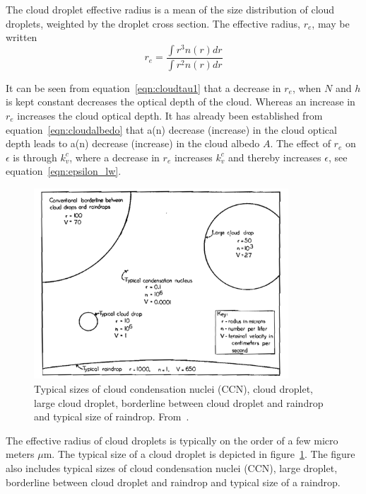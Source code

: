 The cloud droplet effective radius is a mean of the size distribution of cloud droplets, weighted by the droplet cross section. The effective radius, $r_e$, may be written
\begin{equation}
r_e = \frac{\int r^3 n(r) dr}{\int r^2 n(r) dr}
\label{eqn:re}
\end{equation}

It can be seen from equation~\ref{eqn:cloudtau1} that a decrease in $r_e$, when $N$ and $h$ is kept constant decreases the optical depth of the cloud. Whereas an increase in $r_e$ increases the cloud optical depth. It has already been established from equation~\ref{eqn:cloudalbedo} that a(n) decrease (increase) in the cloud optical depth leads to a(n) decrease (increase) in the cloud albedo $A$. The effect of $r_e$ on $\epsilon$ is through $k_v^c$, where a decrease in $r_e$ increases $k_v^c$ and thereby increases $\epsilon$, see equation~\ref{eqn:epsilon_lw}. 

\begin{figure}
\centering
\includegraphics[width=0.85\textwidth]{theory/dropletsize.png}
\caption{Typical sizes of cloud condensation nuclei (CCN), cloud droplet, large cloud droplet, borderline between cloud droplet and raindrop and typical size of raindrop. %
From~\citep{McDonald1958}.}
\label{fig:dropletsize}
\end{figure}

The effective radius of cloud droplets is typically on the order of a few micro meters $\mu\text{m}$. The typical size of a cloud droplet is depicted in figure~\ref{fig:dropletsize}. The figure also includes typical sizes of cloud condensation nuclei (CCN), large droplet, borderline between cloud droplet and raindrop and typical size of a raindrop.


